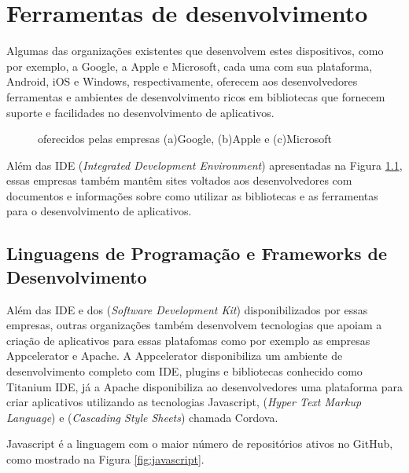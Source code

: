 \chapter{Ferramentas de desenvolvimento}\label{cha:ferramentas}
Algumas das organizações existentes que desenvolvem estes dispositivos, como por exemplo, a Google, a Apple e Microsoft, cada uma com sua plataforma, Android, iOS e Windows, respectivamente, oferecem aos desenvolvedores ferramentas e ambientes de desenvolvimento ricos em bibliotecas que fornecem suporte e facilidades no desenvolvimento de aplicativos.

\begin{figure}[h]
	\center
	\qquad
	\qquad
	\caption[IDE oferecidos pelas empresas]{ oferecidos pelas empresas (a)Google, (b)Apple e (c)Microsoft}
	\label{fig:IDES}
\end{figure}

Além das IDE (\textit{Integrated Development Environment}) apresentadas na Figura \ref{fig:IDES}, essas empresas também mantêm sites voltados aos desenvolvedores com documentos e informações sobre como utilizar as bibliotecas e as ferramentas para o desenvolvimento de aplicativos.

\section{Linguagens de Programação e Frameworks de Desenvolvimento}
Além das IDE e dos  (\textit{Software Development Kit}) disponibilizados por essas empresas, outras organizações também desenvolvem tecnologias que apoiam a criação de aplicativos para essas platafomas como por exemplo as empresas Appcelerator e Apache. A Appcelerator disponibiliza um ambiente de desenvolvimento completo com IDE, plugins e bibliotecas conhecido como Titanium IDE, já a Apache disponibiliza ao desenvolvedores uma plataforma para criar aplicativos utilizando as tecnologias Javascript,  (\textit{Hyper Text Markup Language}) e  (\textit{Cascading Style Sheets}) chamada Cordova.

Javascript é a linguagem com o maior número de repositórios ativos no GitHub, como mostrado na Figura \ref{fig:javascript}.

